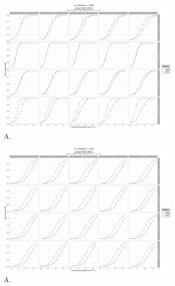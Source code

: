 \documentclass[IB,BIB]{TFUOC}%
\begin{document}
\begin{figure}[!htbp]
\hspace*{-2cm} %
\begin{subfigure}{.65\textwidth}
  \centering
  \includegraphics[width=.9\linewidth]{OBJ1c1005.pdf}
  \caption{\scriptsize{A.}}
  \label{figAppend:OBJ1c1005}
\end{subfigure}%
\begin{subfigure}{.65\textwidth}
\hspace*{-2.3cm} %
  \centering
  \includegraphics[width=.9\linewidth]{OBJ1c2001.pdf}
  \caption{\scriptsize{A.}}
  \label{figAppend:OBJ1c2001}
\end{subfigure}%
\\
\\
\begin{subfigure}{.65\textwidth}

\end{subfigure}
\end{figure}
\end{document}
